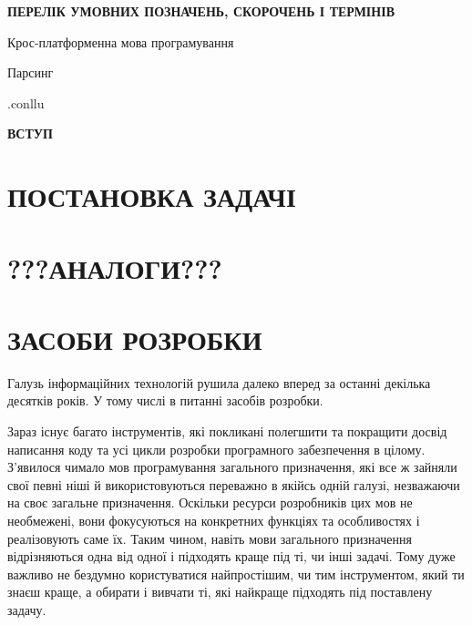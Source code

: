 \renewcommand*\contentsname{\begin{center}ЗМІСТ\end{center}}
\tableofcontents

\newpage

\begin{center}
\textbf{ПЕРЕЛІК УМОВНИХ ПОЗНАЧЕНЬ, СКОРОЧЕНЬ І ТЕРМІНІВ}
\end{center}

\hypertarget{term1}{Крос-платформенна мова програмування}
\hypertarget{term2}{Парсинг}
\hypertarget{term3}{.conllu}


\newpage

\begin{center}
\textbf{ВСТУП}
\end{center}

\newpage

\section{ПОСТАНОВКА ЗАДАЧІ}

\section{???АНАЛОГИ???}

\section{ЗАСОБИ РОЗРОБКИ}
Галузь інформаційних технологій рушила далеко вперед за останні декілька десятків років.
У тому числі в питанні засобів розробки. 


Зараз існує багато інструментів, які покликані
полегшити та покращити досвід написання коду та усі цикли розробки програмного забезпечення
в цілому. З'явилося чимало мов програмування загального призначення,
які все ж зайняли свої певні ніші й використовуються переважно в якійсь одній галузі,
незважаючи на своє загальне призначення. Оскільки ресурси розробників цих мов не необмежені,
вони фокусуються на конкретних функціях та особливостях і реалізовують саме їх. Таким чином,
навіть мови загального призначення відрізняються одна від одної і підходять краще під ті, чи інші задачі. Тому дуже важливо не бездумно користуватися найпростішим, чи тим інструментом,
який ти знаєш краще, а обирати і вивчати ті, які найкраще підходять під поставлену задачу.


